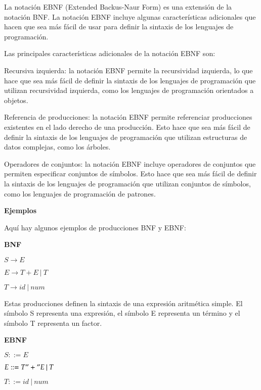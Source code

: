 \noindent La notación EBNF (Extended Backus-Naur Form) es una extensión de la notación BNF. La notación EBNF incluye algunas características adicionales que hacen que sea más fácil de usar para definir la sintaxis de los lenguajes de programación.

Las principales características adicionales de la notación EBNF son:

    Recursiva izquierda: la notación EBNF permite la recursividad izquierda, lo que hace que sea más fácil de definir la sintaxis de los lenguajes de programación que utilizan recursividad izquierda, como los lenguajes de programación orientados a objetos.
   
    Referencia de producciones: la notación EBNF permite referenciar producciones existentes en el lado derecho de una producción. Esto hace que sea más fácil de definir la sintaxis de los lenguajes de programación que utilizan estructuras de datos complejas, como los árboles.
    
    Operadores de conjuntos: la notación EBNF incluye operadores de conjuntos que permiten especificar conjuntos de símbolos. Esto hace que sea más fácil de definir la sintaxis de los lenguajes de programación que utilizan conjuntos de símbolos, como los lenguajes de programación de patrones.

\phantom{text}

\noindent \textbf{Ejemplos}

\phantom{text}
    

Aquí hay algunos ejemplos de producciones BNF y EBNF:

\phantom{text}

\noindent \textbf{BNF}

\phantom{text}

\begin{center}
    $S \xrightarrow{} E$
    
    $E \xrightarrow{} T + E\: |\: T$
    
    $T \xrightarrow{} id\: |\: num$
\end{center}

Estas producciones definen la sintaxis de una expresión aritmética simple. El símbolo S representa una expresión, el símbolo E representa un término y el símbolo T representa un factor.

\phantom{text}

\noindent \textbf{EBNF}

\phantom{text}

\begin{center}
    $S ::= E$
    
    $E ::= T "+" E\: |\: T$
    
    $T ::= id\: |\: num$
\end{center}

